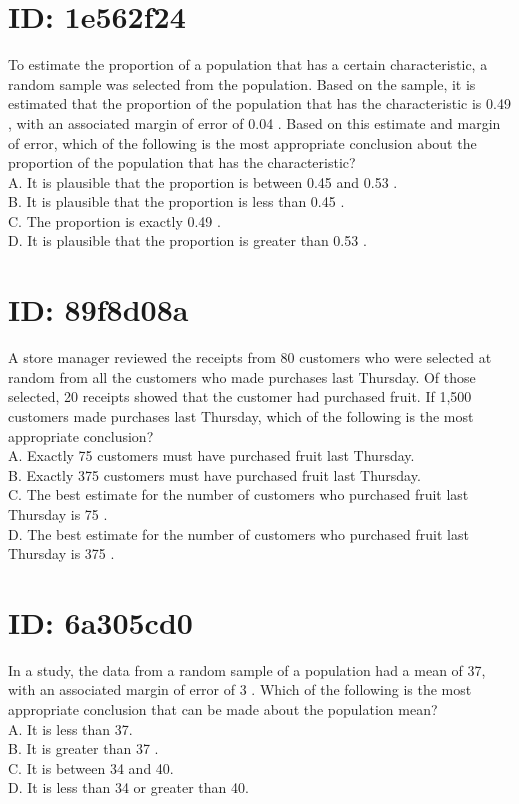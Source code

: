 \section*{ID: 1e562f24}
To estimate the proportion of a population that has a certain characteristic, a random sample was selected from the population. Based on the sample, it is estimated that the proportion of the population that has the characteristic is 0.49 , with an associated margin of error of 0.04 . Based on this estimate and margin of error, which of the following is the most appropriate conclusion about the proportion of the population that has the characteristic?\\
A. It is plausible that the proportion is between 0.45 and 0.53 .\\
B. It is plausible that the proportion is less than 0.45 .\\
C. The proportion is exactly 0.49 .\\
D. It is plausible that the proportion is greater than 0.53 .

\section*{ID: 89f8d08a}
A store manager reviewed the receipts from 80 customers who were selected at random from all the customers who made purchases last Thursday. Of those selected, 20 receipts showed that the customer had purchased fruit. If 1,500 customers made purchases last Thursday, which of the following is the most appropriate conclusion?\\
A. Exactly 75 customers must have purchased fruit last Thursday.\\
B. Exactly 375 customers must have purchased fruit last Thursday.\\
C. The best estimate for the number of customers who purchased fruit last Thursday is 75 .\\
D. The best estimate for the number of customers who purchased fruit last Thursday is 375 .

\section*{ID: 6a305cd0}
In a study, the data from a random sample of a population had a mean of 37, with an associated margin of error of 3 . Which of the following is the most appropriate conclusion that can be made about the population mean?\\
A. It is less than 37.\\
B. It is greater than 37 .\\
C. It is between 34 and 40.\\
D. It is less than 34 or greater than 40.

